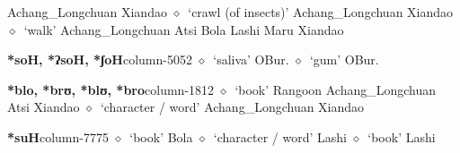          Achang\_Longchuan 
\hspace{1ex}
         Xiandao 
\hspace{1ex}
         $\diamond$~`crawl (of insects)'
         Achang\_Longchuan 
\hspace{1ex}
         Xiandao 
\hspace{1ex}
         $\diamond$~`walk'
         Achang\_Longchuan 
\hspace{1ex}
         Atsi 
\hspace{1ex}
         Bola 
\hspace{1ex}
         Lashi 
\hspace{1ex}
         Maru 
\hspace{1ex}
         Xiandao 
  \item {\footnotesize \textbf{*soH, *ʔsoH, *ʃoH}}{\tiny column-5052}
         $\diamond$~`saliva'
         OBur. 
\hspace{1ex}
         $\diamond$~`gum'
         OBur. 
  \item {\footnotesize \textbf{*blo, *brʊ, *blʊ, *bro}}{\tiny column-1812}
         $\diamond$~`book'
         Rangoon 
\hspace{1ex}
         Achang\_Longchuan 
\hspace{1ex}
         Atsi 
\hspace{1ex}
         Xiandao 
\hspace{1ex}
         $\diamond$~`character / word'
         Achang\_Longchuan 
\hspace{1ex}
         Xiandao 
  \item {\footnotesize \textbf{*suH}}{\tiny column-7775}
         $\diamond$~`book'
         Bola 
\hspace{1ex}
         $\diamond$~`character / word'
         Lashi 
\hspace{1ex}
         $\diamond$~`book'
         Lashi 

